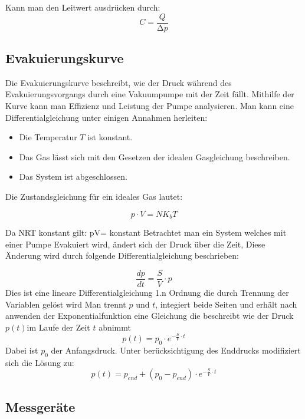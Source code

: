 Kann man den Leitwert ausdrücken durch:
\begin{equation}
    C=\frac{Q}{\increment p}
\end{equation} 


\subsection{Evakuierungskurve}
Die Evakuierungskurve beschreibt, wie der Druck während des Evakuierungsvorgangs durch eine Vakuumpumpe 
mit der Zeit fällt. Mithilfe der Kurve kann man Effizienz und Leistung der Pumpe analysieren.
Man kann eine Differentialgleichung unter einigen Annahmen herleiten:
\begin{itemize}
\item Die Temperatur \(T \) ist konstant. 
\item Das Gas lässt sich mit den Gesetzen der idealen Gasgleichung beschreiben.
\item Das System ist abgeschlossen.
\end{itemize}

Die Zustandsgleichung für ein ideales Gas lautet:

\begin{equation}
    p \cdot V=NK_bT 
\end{equation}

Da N\cdot R\cdot T konstant gilt:  p\cdot V= konstant
Betrachtet man ein System welches mit einer Pumpe Evakuiert wird, ändert sich der Druck über die Zeit, 
Diese Änderung wird durch folgende Differentialgleichung beschrieben:

\begin{equation}
    \frac{dp}{dt}=\frac{S}{V}\cdot p
\end{equation}
Dies ist eine lineare Differentialgleichung 1.n Ordnung die durch Trennung der Variablen gelöst wird
Man trennt \(p \) und \(t \), integiert beide Seiten und erhält nach anwenden der Exponentialfunktion eine
Gleichung die beschreibt wie der Druck \(p(t)\)im Laufe der Zeit \(t \) abnimmt
\begin{equation}
p(t)=p_0\cdot e^{-\frac{S}{V}\cdot t}
\end{equation}
Dabei ist \(p_0\) der Anfangsdruck. Unter berücksichtigung des Enddrucks modifiziert sich die Lösung zu:
\begin{equation}
    p(t)=p_{end}+(p_0-p_{end})\cdot e^{-\frac{S}{V}\cdot t}
\end{equation}

\subsection{Messgeräte}



















\cite{sample}
